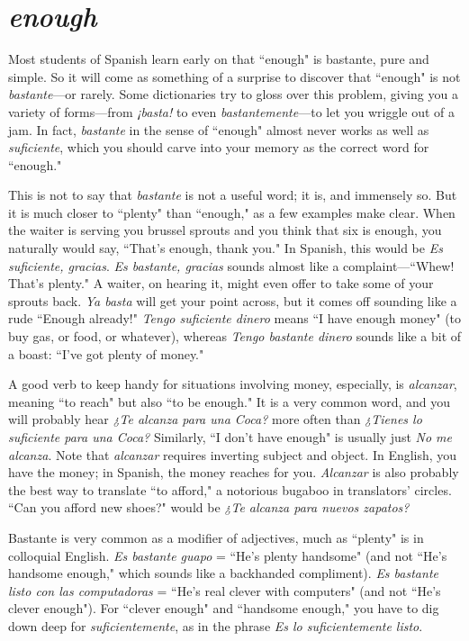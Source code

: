 \section{\emph{enough}}

Most students of Spanish learn early on that ``enough" is bastante, pure and simple. So it will come as something of a surprise to
discover that ``enough" is not \emph{bastante}---or rarely. Some dictionaries
try to gloss over this problem, giving you a variety of forms---from
\emph{¡basta!} to even \emph{bastantemente}---to let you wriggle out of a jam. In
fact, \emph{bastante} in the sense of ``enough" almost never works as well as
\emph{suficiente}, which you should carve into your memory as the correct
word for ``enough."

This is not to say that \emph{bastante} is not a useful word; it is,
and immensely so. But it is much closer to ``plenty" than ``enough,"
as a few examples make clear. When the waiter is serving you brussel sprouts and you think that six is enough, you naturally would say,
``That's enough, thank you." In Spanish, this would be \emph{Es suficiente,
	gracias}. \emph{Es bastante, gracias} sounds almost like a complaint---``Whew!
That's plenty." A waiter, on hearing it, might even offer to take some
of your sprouts back. \emph{Ya basta} will get your point across, but it comes
off sounding like a rude ``Enough already!" \emph{Tengo suficiente dinero}
means ``I have enough money" (to buy gas, or food, or whatever),
whereas \emph{Tengo bastante dinero} sounds like a bit of a boast: ``I've got
plenty of money."

A good verb to keep handy for situations involving money, especially, is \emph{alcanzar}, meaning ``to reach" but also ``to be enough." It is
a very common word, and you will probably hear \emph{¿Te alcanza para una
	Coca?} more often than \emph{¿Tienes lo suficiente para una Coca?} Similarly,
``I don't have enough" is usually just \emph{No me alcanza}. Note that
\emph{alcanzar} requires inverting subject and object. In English, you have the
money; in Spanish, the money reaches for you. \emph{Alcanzar} is also probably the best way to translate ``to afford," a notorious bugaboo in translators' circles. ``Can you afford new shoes?" would be \emph{¿Te alcanza para
	nuevos zapatos?}

Bastante is very common as a modifier of adjectives, much as
``plenty" is in colloquial English. \emph{Es bastante guapo} = ``He's plenty
handsome" (and not ``He's handsome enough," which sounds like a
backhanded compliment). \emph{Es bastante listo con las computadoras} =
``He's real clever with computers" (and not ``He's clever enough"). For
``clever enough" and ``handsome enough," you have to dig down deep
for \emph{suficientemente}, as in the phrase \emph{Es lo suficientemente listo}.

